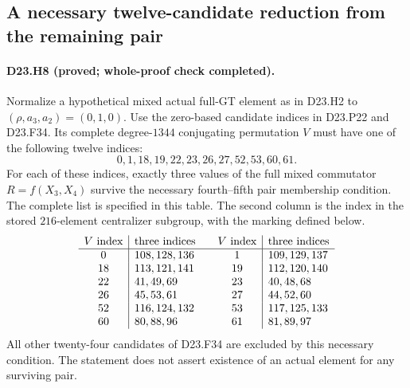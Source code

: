 \subsection{A necessary twelve-candidate reduction from the remaining pair}

\paragraph{D23.H8 (proved; whole-proof check completed).}
Normalize a hypothetical mixed actual full-GT element as in
D23.H2 to $(\rho,a_3,a_2)=(0,1,0)$. Use the zero-based
candidate indices in D23.P22 and D23.F34. Its complete
degree-$1344$ conjugating permutation $V$ must have one of
the following twelve indices:
\[
       0,1,18,19,22,23,26,27,52,53,60,61.
\]
For each of these indices, exactly three values of the full
mixed commutator $R=f(X_3,X_4)$ survive the necessary
fourth--fifth pair membership condition. The complete list is
specified in this table. The second column is the index in
the stored $216$-element centralizer subgroup, with the
marking defined below.
\[
\begin{array}{c|l@{\qquad}c|l}
 V\text{ index}&\text{three indices}&V\text{ index}&\text{three indices}\\\hline
 0&108,128,136&1&109,129,137\\
 18&113,121,141&19&112,120,140\\
 22&41,49,69&23&40,48,68\\
 26&45,53,61&27&44,52,60\\
 52&116,124,132&53&117,125,133\\
 60&80,88,96&61&81,89,97
\end{array}
\]
All other twenty-four candidates of D23.F34 are excluded by
this necessary condition. The statement does not assert
existence of an actual element for any surviving pair.

